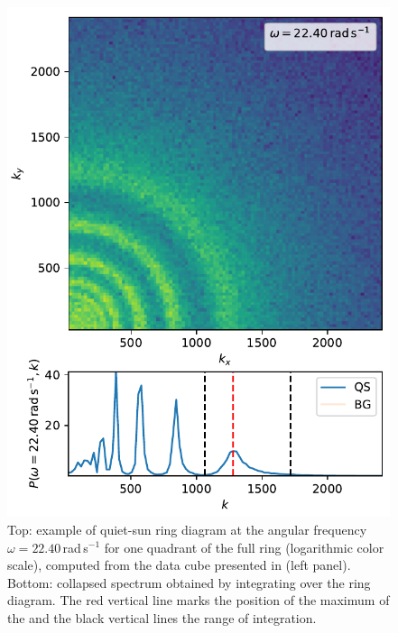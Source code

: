 \documentclass{aa}
\begin{document}
\begin{figure}\centering
	\includegraphics[width=1.0\linewidth]{ring_diagram_spectrum}
	\caption{Top: example of quiet-sun ring diagram at
	the angular frequency 
	$\omega=22.40$\,rad\,s$^{-1}$ 
	for one quadrant of the full ring (logarithmic color scale), computed from the data cube presented in  (left panel). 
	Bottom: collapsed spectrum obtained by 
	integrating over
	the ring diagram. The red vertical line marks the position of the maximum of the \fff and the black vertical lines the range of integration.}
	\label{ring_diagram}
\end{figure}
\end{document}
